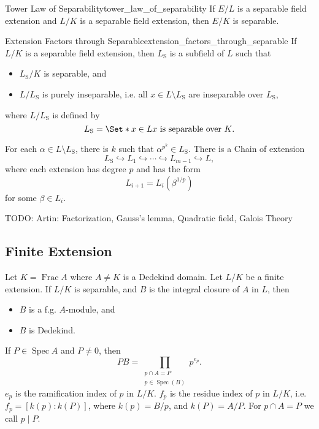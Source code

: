 \documentclass{article}
\begin{document}
\begin{corollary}{Tower Law of Separability}{tower_law_of_separability}
    If $E/L$ is a separable field extension and $L/K$ is a separable field extension, then $E/K$ is separable.
\end{corollary}

\begin{corollary}{Extension Factors through Separable}{extension_factors_through_separable}
    If $L/K$ is a separable field extension, then $L_{\mathrm{S}}$ is a subfield of $L$ such that
    \begin{itemize}
        \item $L_{\mathrm{S}}/K$ is separable, and
        \item $L/L_{\mathrm{S}}$ is purely inseparable, i.e. all $x\in L \setminus L_{\mathrm{S}}$ are inseparable over $L_{\mathrm{S}}$,
    \end{itemize}
    where $L/L_{\mathrm{S}}$ is defined by
    \[ L_{\mathrm{S}} = \Set*{x\in L}{x\text{ is separable over } K}. \]
\end{corollary}
For each $\alpha\in L\setminus L_{\mathrm{S}}$, there is $k$ such that $\alpha^{p^k}\in L_{\mathrm{S}}$.
There is a Chain of extension
\[ L_{\mathrm{S}} \hookrightarrow L_1 \hookrightarrow \cdots \hookrightarrow L_{m-1} \hookrightarrow L, \]
where each extension has degree $p$ and has the form
\[ L_{i+1} = L_i(\beta^{1/p}) \]
for some $\beta \in L_i$.


{TODO: \color{red} Artin: Factorization, Gauss's lemma, Quadratic field, Galois Theory}
\par

\subsection{Finite Extension}

Let $K = \operatorname{Frac} A$ where $A\neq K$ is a Dedekind domain.
Let $L/K$ be a finite extension.
If $L/K$ is separable, and $B$ is the integral closure of $A$ in $L$, then
\begin{itemize}
    \item $B$ is a f.g. $A$-module, and
    \item $B$ is Dedekind.
\end{itemize}

\par

If $P\in \operatorname{Spec} A$ and $P\neq 0$, then
\[ PB = \prod_{\substack{p\cap A = P \\ p\in \operatorname{Spec}(B)}} p^{e_p}. \]
$e_p$ is the ramification index of $p$ in $L/K$.
$f_p$ is the residue index of $p$ in $L/K$, i.e. $f_p = [k(p):k(P)]$, where $k(p) = B/p$, and $k(P) = A/P$.
For $p\cap A = P$ we call $p\mid P$.
\end{document}
